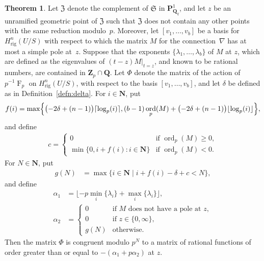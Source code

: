 \documentclass[a4paper,11pt]{article}
\numberwithin{equation}{section}
\newcommand{\NN}{\mathbf{N}} %
\newcommand{\ZZ}{\mathbf{Z}} %
\newcommand{\QQ}{\mathbf{Q}} %
\DeclareMathOperator{\ord}{ord}          %
\DeclareMathOperator{\Frob}{F}           %
\providecommand{\Hrig}{H_{\text{rig}}}  %
\theoremstyle{definition}
\newtheorem{thm}{Theorem}[section]
\begin{document}
\begin{thm} \label{thm:KedlayaTuitman}
Let $\mathfrak{Z}$ denote the complement of $\mathfrak{S}$ in 
$\mathbf{P}^{1}_{\mathbf{Q}_q}$, and let $z$ be an unramified geometric point 
of $\mathfrak{Z}$ such that $\mathfrak{Z}$ does not contain any other points 
with the same reduction modulo~$p$. Moreover, let $[v_1,\dotsc,v_b]$ be a basis for 
$\Hrig^n(U/S)$ with respect to which the matrix $M$ for the connection~$\nabla$ 
has at most a simple pole at~$z$. Suppose that the exponents 
$\{ \lambda_1, \dotsc, \lambda_{b} \}$ of $M$ at $z$, 
which are defined as the eigenvalues of $(t - z) M \vert_{t=z}$, and known to 
be rational numbers, are contained in $\ZZ_p \cap \QQ$. Let $\Phi$ denote the matrix of the action of 
$p^{-1} \Frob_p$ on $\Hrig^{n}(U/S)$, with respect to the basis 
$[v_1,\dotsc,v_b]$, and let $\delta$ be defined as in 
Definition~\ref{defn:delta}. For $i \in \NN$, put
\begin{align*}
f(i) = \max \Bigl\{ \bigl( -2 \delta + (n-1) \bigr) \lceil \log_p(i) \rceil, 
(b-1) \ord_p(M) + \bigl( -2 \delta + (n-1) \bigr) \lfloor \log_p(i) \rfloor 
\Bigr\},
\end{align*}
and define 
\begin{align*}
c = \begin{cases}
0 & \mbox{if $\ord_p(M) \geq 0$}, \\
\min\{0, i + f(i): i \in \NN\} & \mbox{if $\ord_p(M) < 0$}.
\end{cases}
\end{align*}
For $N \in \NN$, put
\begin{align*}
g(N) &= \max \{i \in \NN \; | \; i + f(i) - \delta + c  < N \},
\end{align*}
and define
\begin{align*}
\alpha_1 &= \lfloor -p \min_i \{ \lambda_i \} + \max_{i} \{\lambda_i\} \rfloor, \\ 
\alpha_2 &=  \left \{ 
         \begin{array}{cl}
         0  & \mbox{if $M$ does not have a pole at $z$},  \\
         0  & \mbox{if $z \in \{0,\infty \}$}, \\
         g(N) & \mbox{otherwise}.
         \end{array}
         \right. 
\end{align*}
Then the matrix $\Phi$ is congruent modulo $p^{N}$ to a matrix of rational 
functions of order greater than or equal to $-(\alpha_1+p \alpha_2)$ at $z$. 
\end{thm}
\end{document}
